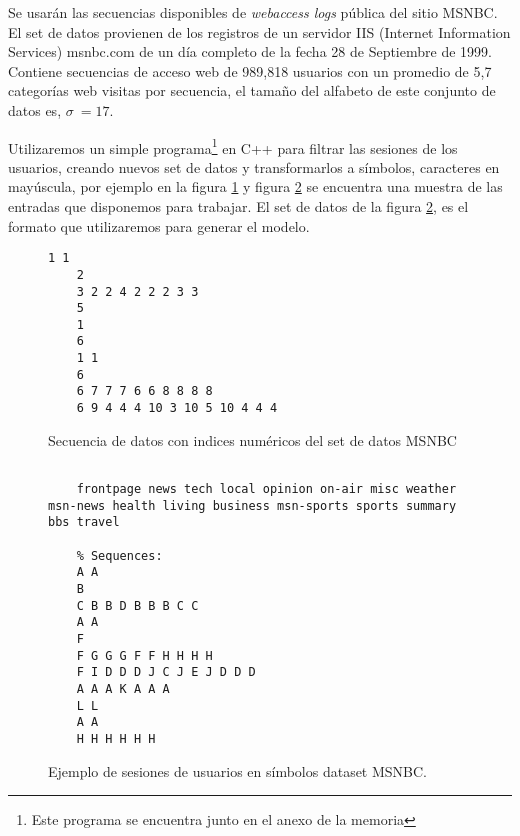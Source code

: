 
Se usarán las secuencias disponibles de \emph{webaccess logs} pública del sitio MSNBC. El set de datos provienen de los registros de un servidor {IIS} (Internet Information Services) msnbc.com de un día completo de la fecha  28 de Septiembre de 1999. 
Contiene secuencias de acceso web de 989,818 usuarios con un promedio de 5,7 categorías web visitas por secuencia, el tamaño del alfabeto de este conjunto de datos es, $\sigma \ = 17$.




Utilizaremos un simple programa\footnote{Este programa se encuentra junto en el anexo de la memoria} en {C++ }para filtrar las sesiones de los usuarios, creando nuevos set de datos y transformarlos a símbolos, caracteres en mayúscula, por ejemplo en la figura \ref{fig:sesiones-ds-msbc-num}  y figura \ref{fig:sesiones-ds-basicos} se encuentra una muestra de las entradas que disponemos para trabajar. El set de datos de la figura \ref{fig:sesiones-ds-basicos}, es el formato que utilizaremos para generar el modelo.


\begin{figure}[t] 
	\centering
	\begin{lstlisting}[frame=single,basicstyle=\ttfamily\tiny,]
	1 1 
	2 
	3 2 2 4 2 2 2 3 3 
	5 
	1 
	6 
	1 1 
	6 
	6 7 7 7 6 6 8 8 8 8 
	6 9 4 4 4 10 3 10 5 10 4 4 4 
	\end{lstlisting}	
	\caption{Secuencia de datos con indices numéricos del set de datos MSNBC}
	\label{fig:sesiones-ds-msbc-num}
\end{figure}




\begin{figure}[t] 
	\centering
	\begin{lstlisting}[frame=single,basicstyle=\ttfamily\tiny,]
	% Different categories found in input file:
	
	frontpage news tech local opinion on-air misc weather msn-news health living business msn-sports sports summary bbs travel
	
	% Sequences:
	A A 
	B 
	C B B D B B B C C 
	A A 
	F 
	F G G G F F H H H H 
	F I D D D J C J E J D D D 
	A A A K A A A 
	L L 
	A A 
	H H H H H H 
	\end{lstlisting}
	\caption{Ejemplo de sesiones de usuarios en símbolos dataset MSNBC.}
	\label{fig:sesiones-ds-basicos}
\end{figure}






